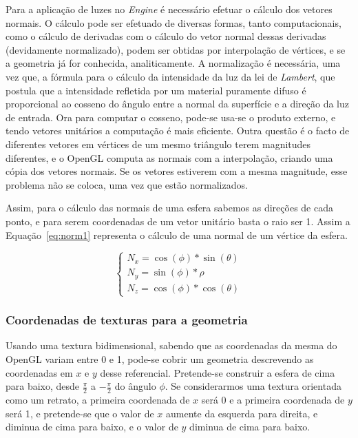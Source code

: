 Para a aplicação de luzes no \emph{Engine} é necessário efetuar o cálculo dos
vetores normais. O cálculo pode ser efetuado de diversas formas, tanto
computacionais, como o cálculo de derivadas com o cálculo do vetor normal dessas
derivadas (devidamente normalizado), podem ser obtidas por interpolação de
vértices, e se a geometria já for conhecida, analiticamente. A normalização
é necessária, uma vez que, a fórmula para o cálculo da intensidade da luz da lei
de \emph{Lambert}, que postula que a intensidade refletida por um material
puramente difuso é proporcional ao cosseno do ângulo entre a normal da
superfície e a direção da luz de entrada. Ora para computar o cosseno, pode-se
usa-se o produto externo, e tendo vetores unitários a computação é mais
eficiente. Outra questão é o facto de diferentes vetores em vértices de um mesmo
triângulo terem magnitudes diferentes, e o OpenGL computa as normais com
a interpolação, criando uma cópia dos vetores normais. Se os vetores estiverem
com a mesma magnitude, esse problema não se coloca, uma vez que estão
normalizados.

Assim, para o cálculo das normais de uma esfera sabemos as direções de cada
ponto, e para serem coordenadas de um vetor unitário basta o raio ser 1. Assim
a Equação~\ref{eq:norm1} representa o cálculo de uma normal de um vértice da
esfera.

\begin{equation}
    \begin{cases}
    N_x = \cos(\phi) * \sin(\theta) \\
    N_y = \sin(\phi) * \rho \\
    N_z = \cos(\phi) * \cos(\theta) 
    \end{cases}
\label{eq:norm1}
\end{equation}


\subsubsection{Coordenadas de texturas para a geometria}

Usando uma textura bidimensional, sabendo que as coordenadas da mesma do OpenGL
variam entre 0 e 1, pode-se cobrir um geometria descrevendo as coordenadas em
$x$ e $y$ desse referencial. Pretende-se construir a esfera de cima para baixo,
desde $\frac{\pi}{2}$ a $-\frac{\pi}{2}$ do ângulo $\phi$. Se considerarmos uma
textura orientada como um retrato, a primeira coordenada de $x$ será
0 e a primeira coordenada de $y$ será 1, e pretende-se que o valor de $x$
aumente da esquerda para direita, e diminua de cima para baixo, e o valor de $y$
diminua de cima para baixo.

